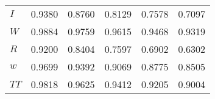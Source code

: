\begin{center}
\begin{longtable}{lccccc}
$I         $	 & 	    0.9380	 & 	    0.8760	 & 	    0.8129	 & 	    0.7578	 & 	    0.7097 \\ 
$W         $	 & 	    0.9884	 & 	    0.9759	 & 	    0.9615	 & 	    0.9468	 & 	    0.9319 \\ 
$R         $	 & 	    0.9200	 & 	    0.8404	 & 	    0.7597	 & 	    0.6902	 & 	    0.6302 \\ 
$w         $	 & 	    0.9699	 & 	    0.9392	 & 	    0.9069	 & 	    0.8775	 & 	    0.8505 \\ 
$TT        $	 & 	    0.9818	 & 	    0.9625	 & 	    0.9412	 & 	    0.9205	 & 	    0.9004 \\ 
\end{longtable}
 \end{center}
